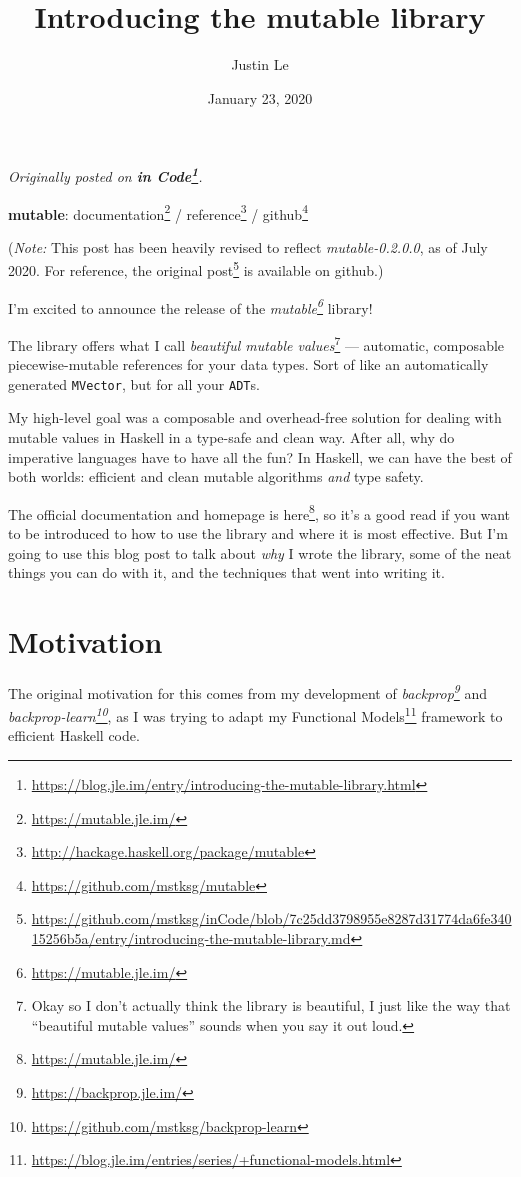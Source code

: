 \documentclass[]{article}
\title{Introducing the mutable library}
\author{Justin Le}
\date{January 23, 2020}
\renewcommand{\href}[2]{#2\footnote{\url{#1}}}
\begin{document}
\maketitle

\emph{Originally posted on
\textbf{\href{https://blog.jle.im/entry/introducing-the-mutable-library.html}{in
Code}}.}

\textbf{mutable}: \href{https://mutable.jle.im/}{documentation} /
\href{http://hackage.haskell.org/package/mutable}{reference} /
\href{https://github.com/mstksg/mutable}{github}

(\emph{Note:} This post has been heavily revised to reflect
\emph{mutable-0.2.0.0}, as of July 2020. For reference,
\href{https://github.com/mstksg/inCode/blob/7c25dd3798955e8287d31774da6fe34015256b5a/entry/introducing-the-mutable-library.md}{the
original post} is available on github.)

I'm excited to announce the release of the
\emph{\href{https://mutable.jle.im/}{mutable}} library!

The library offers what I call \emph{beautiful mutable values}\footnote{Okay so
  I don't actually think the library is beautiful, I just like the way that
  ``beautiful mutable values'' sounds when you say it out loud.} --- automatic,
composable piecewise-mutable references for your data types. Sort of like an
automatically generated \texttt{MVector}, but for all your \texttt{ADT}s.

My high-level goal was a composable and overhead-free solution for dealing with
mutable values in Haskell in a type-safe and clean way. After all, why do
imperative languages have to have all the fun? In Haskell, we can have the best
of both worlds: efficient and clean mutable algorithms \emph{and} type safety.

The \href{https://mutable.jle.im/}{official documentation and homepage is here},
so it's a good read if you want to be introduced to how to use the library and
where it is most effective. But I'm going to use this blog post to talk about
\emph{why} I wrote the library, some of the neat things you can do with it, and
the techniques that went into writing it.

\hypertarget{motivation}{%
\section{Motivation}\label{motivation}}

The original motivation for this comes from my development of
\emph{\href{https://backprop.jle.im/}{backprop}} and
\emph{\href{https://github.com/mstksg/backprop-learn}{backprop-learn}}, as I was
trying to adapt my
\href{https://blog.jle.im/entries/series/+functional-models.html}{Functional
Models} framework to efficient Haskell code.
\end{document}
